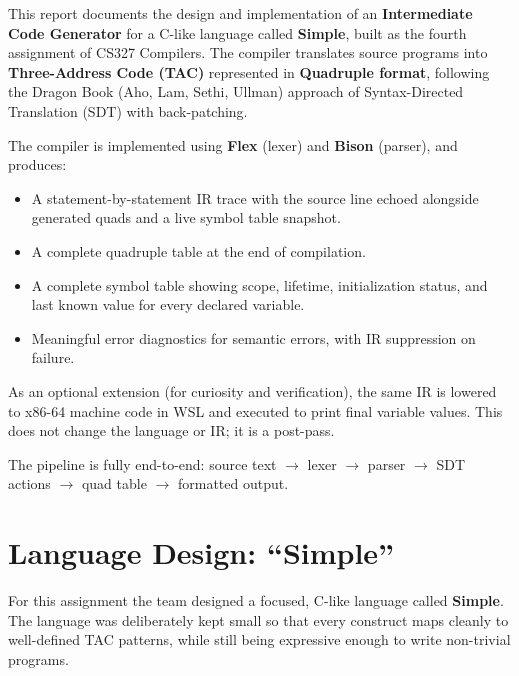 \documentclass[11pt]{article}
\begin{document}
This report documents the design and implementation of an \textbf{Intermediate Code Generator} for a C-like language called \textbf{Simple}, built as the fourth assignment of CS327 Compilers. The compiler translates source programs into \textbf{Three-Address Code (TAC)} represented in \textbf{Quadruple format}, following the Dragon Book (Aho, Lam, Sethi, Ullman) approach of Syntax-Directed Translation (SDT) with back-patching.

\vspace{0.4cm}

\noindent The compiler is implemented using \textbf{Flex} (lexer) and \textbf{Bison} (parser), and produces:
\begin{itemize}[leftmargin=2cm]
    \item A statement-by-statement IR trace with the source line echoed alongside generated quads and a live symbol table snapshot.
    \item A complete quadruple table at the end of compilation.
    \item A complete symbol table showing scope, lifetime, initialization status, and last known value for every declared variable.
    \item Meaningful error diagnostics for semantic errors, with IR suppression on failure.
\end{itemize}

\noindent As an optional extension (for curiosity and verification), the same IR is lowered to x86-64 machine code in WSL and executed to print final variable values. This does not change the language or IR; it is a post-pass.

\vspace{0.4cm}

\noindent The pipeline is fully end-to-end: source text $\rightarrow$ lexer $\rightarrow$ parser $\rightarrow$ SDT actions $\rightarrow$ quad table $\rightarrow$ formatted output.

\section{Language Design: ``Simple''}

For this assignment the team designed a focused, C-like language called \textbf{Simple}. The language was deliberately kept small so that every construct maps cleanly to well-defined TAC patterns, while still being expressive enough to write non-trivial programs.
\end{document}
